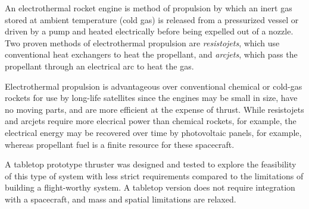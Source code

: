 \documentclass[journal]{IEEEtran}
\begin{document}
An electrothermal rocket engine is method of propulsion by which an inert gas stored at ambient temperature (cold gas) is released from a pressurized vessel or driven by a pump and heated electrically before being expelled out of a nozzle.
Two proven methods of electrothermal propulsion are \emph{resistojets}, which use conventional heat exchangers to heat the propellant, and \emph{arcjets}, which pass the propellant through an electrical arc to heat the gas.

Electrothermal propulsion is advantageous over conventional chemical or cold-gas rockets for use by long-life satellites since the engines may be small in size, have no moving parts, and are more efficient at the expense of thrust.
While resistojets and arcjets require more elecrical power than chemical rockets, for example, the electrical energy may be recovered over time by photovoltaic panels, for example, whereas propellant fuel is a finite resource for these spacecraft.

A tabletop prototype thruster was designed and tested to explore the feasibility of this type of system with less strict requirements compared to the limitations of building a flight-worthy system.
A tabletop version does not require integration with a spacecraft, and mass and spatial limitations are relaxed.
\end{document}
